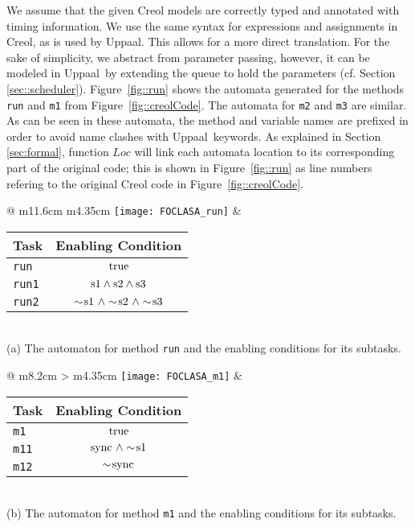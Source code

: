 \documentclass[copyright,creativecommons]{eptcs}
\theoremstyle{definition}
\newcommand{\id}[1]{\mathit{#1}}
\newcommand{\Uppaal}{{\sc Uppaal}\xspace}
\newcommand{\tneg}{\sim\!}
\begin{document}
We assume that the given Creol models are correctly typed and annotated with timing information.
We use the same syntax for expressions and assignments in Creol, as is used by \Uppaal. This allows for a more direct translation.
For the sake of simplicity, we abstract from parameter passing, however, it can be modeled in \Uppaal\ by extending the queue to hold the parameters (cf. Section \ref{sec::scheduler}).
Figure~\ref{fig::run}  shows the automata generated for the methods \lstinline$run$ and \lstinline$m1$ from Figure~\ref{fig::creolCode}.
The automata for \lstinline$m2$ and \lstinline$m3$ are similar.
As can be seen in these automata, the method and variable names are prefixed in order to avoid name clashes with \Uppaal\ keywords.
As explained in Section \ref{sec:formal}, function $\id{Loc}$ will link each automata location to its corresponding part of the original code;
this is shown in Figure~\ref{fig::run} as line numbers refering to the original Creol code in Figure~\ref{fig::creolCode}.


\begin{figure*}[tb]
\begin{center}
\begin{tabular}{@{} m{11.6cm}  m{4.35cm}}
\texttt{[image: FOCLASA\_run]} &
{\footnotesize\bfseries
\renewcommand{\arraystretch}{1.25}
\begin{tabular}{@{}l@{~}|@{~}c@{}}
Task & Enabling Condition\\
\hline
\verb"run" & ${\rm true}$\\
\verb"run1" & ${\rm s1 \land s2 \land s3}$\\
\verb"run2" & ${\rm \tneg s1~ \land \tneg s2 ~\land \tneg s3}$ \\
\end{tabular}
\vspace{.5cm}
}
\end{tabular}
\\
(a) The automaton for method {\tt run} and the enabling conditions for its subtasks. \\
\end{center}



\centering
\begin{tabular}{@{} m{8.2cm} >{\centering\arraybackslash} m{4.35cm}}
\texttt{[image: FOCLASA\_m1]}
 &
{\footnotesize\bfseries
\renewcommand{\arraystretch}{1.25}
\begin{tabular}{l|c}
Task & Enabling Condition\\
\hline
\verb"m1" & ${\rm true}$\\
\verb"m11" & ${\rm sync~ \land \tneg s1}$\\
\verb"m12" & ${\rm \tneg sync}$\\
\end{tabular}
}
\end{tabular}
\\
(b) The automaton for method {\tt m1} and the enabling conditions for its subtasks. \caption{The labels on automata location refer to line numbers in Figure~\ref{fig::creolCode} (cf. function $\id{Loc}$ in Table \ref{tab:function}).}\label{fig::run}
\end{figure*}
\end{document}
